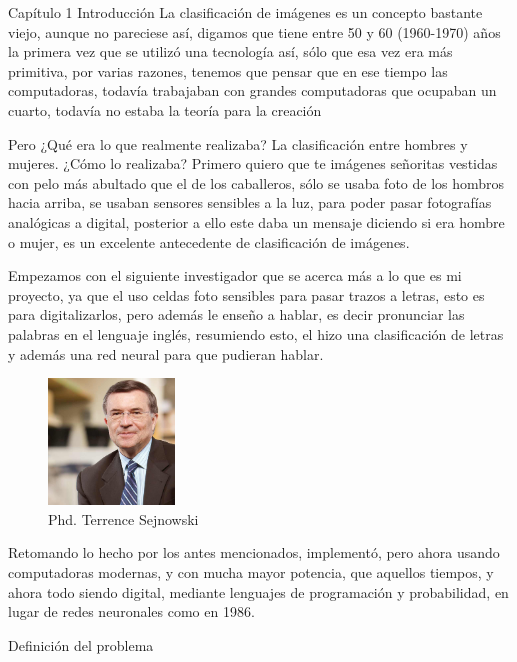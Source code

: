 \documentclass[
  spanish,
  ignorenonframetext,
]{beamer}
\begin{document}
\begin{frame}{Capítulo 1 Introducción}
\protect\hypertarget{capuxedtulo-1-introducciuxf3n}{}
La clasificación de imágenes es un concepto bastante viejo, aunque no
pareciese así, digamos que tiene entre 50 y 60 (1960-1970) años la
primera vez que se utilizó una tecnología así, sólo que esa vez era más
primitiva, por varias razones, tenemos que pensar que en ese tiempo las
computadoras, todavía trabajaban con grandes computadoras que ocupaban
un cuarto, todavía no estaba la teoría para la creación

Pero ¿Qué era lo que realmente realizaba? La clasificación entre hombres
y mujeres. ¿Cómo lo realizaba? Primero quiero que te imágenes señoritas
vestidas con pelo más abultado que el de los caballeros, sólo se usaba
foto de los hombros hacia arriba, se usaban sensores sensibles a la luz,
para poder pasar fotografías analógicas a digital, posterior a ello este
daba un mensaje diciendo si era hombre o mujer, es un excelente
antecedente de clasificación de imágenes.

Empezamos con el siguiente investigador que se acerca más a lo que es mi
proyecto, ya que el uso celdas foto sensibles para pasar trazos a
letras, esto es para digitalizarlos, pero además le enseño a hablar, es
decir pronunciar las palabras en el lenguaje inglés, resumiendo esto, el
hizo una clasificación de letras y además una red neural para que
pudieran hablar.

\begin{figure}
\centering
\includegraphics[width=0.3\textwidth,height=\textheight]{img/README/terrence.jpg}
\caption{Phd. Terrence Sejnowski}
\end{figure}

Retomando lo hecho por los antes mencionados, implementó, pero ahora
usando computadoras modernas, y con mucha mayor potencia, que aquellos
tiempos, y ahora todo siendo digital, mediante lenguajes de programación
y probabilidad, en lugar de redes neuronales como en 1986.
\end{frame}

\begin{frame}{Definición del problema}
\protect\hypertarget{definiciuxf3n-del-problema}{}
\end{frame}
\end{document}

